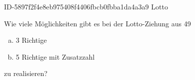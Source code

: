 \begin{exercise}
      {ID-5897f2f4e8eb975408f4406fbcb0fbba1da4a3a9}
      {Lotto}
  \ifproblem\problem\par
    Wie viele Möglichkeiten gibt es bei der Lotto-Ziehung  aus 49\grqq{}
    \begin{enumerate}[a)]
      \item 3 Richtige
      \item 5 Richtige mit Zusatzzahl
    \end{enumerate}
    zu realisieren?
  \fi
\end{exercise}
